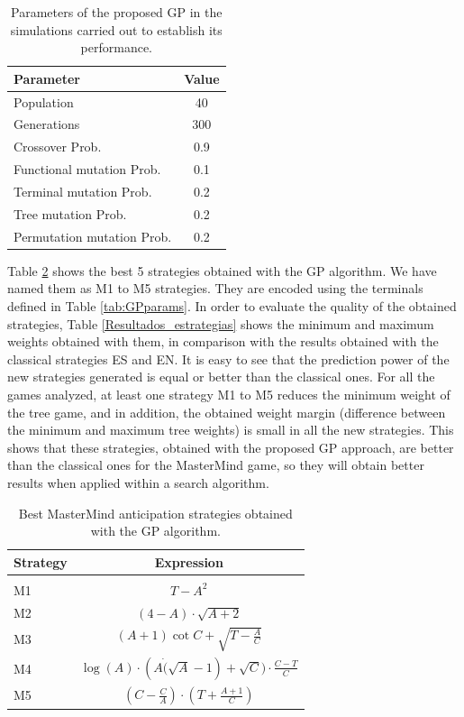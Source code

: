 \begin{table}[!ht]
\centering
\caption{Parameters of the proposed GP in the simulations carried out to establish its performance. \label{tab:paramsGP}}
\begin{tabular}{lc}
\hline
Parameter & Value \\
\hline 
Population & 40\\
Generations & 300\\
Crossover Prob.  & 0.9 \\
Functional mutation Prob. & 0.1 \\
Terminal mutation Prob. & 0.2\\
Tree mutation Prob. & 0.2\\
Permutation mutation Prob. & 0.2\\
\hline
\end{tabular}
\end{table}

Table \ref{Nuevas_estrategias} shows the best 5 strategies obtained
with the GP algorithm. We have named them as M1 to M5 strategies. They
are encoded using the terminals defined in Table
\ref{tab:GPparams}. In order to evaluate the quality of the obtained
strategies, Table \ref{Resultados_estrategias} shows the minimum and
maximum weights obtained with them, in comparison with the results
obtained with the classical strategies ES and EN. It is easy to see
that the prediction power of the new strategies generated is equal or
better than the classical ones. For all the games analyzed, at least
one strategy M1 to M5 reduces the minimum weight of the tree game, and
in addition, the obtained weight margin (difference between the
minimum and maximum tree weights) is small in all the new
strategies. This shows that these strategies, obtained with the
proposed GP approach,  are better than the classical ones for the MasterMind game, so they will obtain better results when applied within a search algorithm.


\begin{table}[!ht]
\centering
\caption{Best MasterMind anticipation strategies obtained with the GP algorithm. \label{Nuevas_estrategias}}
\begin{tabular}{lc}
\hline
Strategy & Expression\\
\hline \\
M1& $T-A^2$\\
M2& $(4-A) \cdot \sqrt{A+2}$\\
M3& $(A+1) \cot C + \sqrt{T-\frac{A}{C}}$\\
M4& $\log(A) \cdot (A \dot (\sqrt{A}-1)+\sqrt{C})\cdot \frac{C-T}{C}$\\
M5& $\left(C-\frac{C}{A}\right) \cdot \left(T+\frac{A+1}{C}\right)$\\
\hline
\end{tabular}
\end{table}


